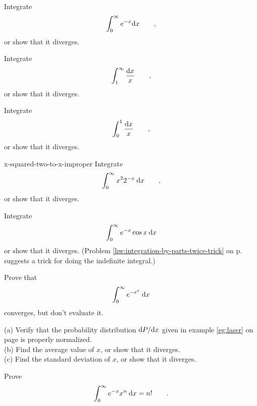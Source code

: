 \begin{hwsection}

\begin{hw}
Integrate
\begin{equation*}
  \int_0^\infty e^{-x} \textup{d} x \qquad ,
\end{equation*}
or show that it diverges.
\end{hw}

\begin{hw}
Integrate
\begin{equation*}
  \int_1^\infty \frac{\textup{d} x}{x} \qquad ,
\end{equation*}
or show that it diverges.
\end{hw}

\begin{hw}
Integrate
\begin{equation*}
  \int_0^1 \frac{\textup{d} x}{x} \qquad ,
\end{equation*}
or show that it diverges.
\end{hw}

\begin{hwwithsoln}{x-squared-two-to-x-improper}
Integrate
\begin{equation*}
  \int_0^\infty x^2 2^{-x} \:\textup{d} x \qquad ,
\end{equation*}
or show that it diverges.
\end{hwwithsoln}

\begin{hw}
Integrate
\begin{equation*}
  \int_0^\infty e^{-x}\cos x \: \textup{d} x
\end{equation*}
or show that it diverges. (Problem \ref{hw:integration-by-parts-twice-trick} on p.~\pageref{hw:integration-by-parts-twice-trick} suggests
a trick for doing the indefinite integral.)
\end{hw}

\begin{hw}
Prove that
\begin{equation*}
  \int_0^\infty e^{-e^x} \: \textup{d} x
\end{equation*}
converges, but don't evaluate it.
\end{hw}

\begin{hw}\label{hw:laser}
(a) Verify that the probability distribution $\textup{d} P/\textup{d} x$ given in example \ref{eg:laser} on page \pageref{eg:laser}
is properly normalized.\\
(b) Find the average value of $x$, or show that it diverges.\\
(c) Find the standard deviation of $x$, or show that it diverges.
\end{hw}

\begin{hw}[2]
Prove
\begin{equation*}
  \int_0^\infty e^{-x}x^n\:\textup{d} x = n! \qquad .
\end{equation*}
\end{hw}

\end{hwsection}

